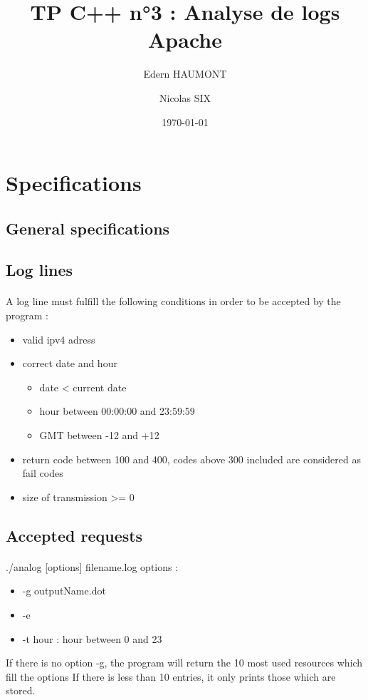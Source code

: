 \documentclass[a4paper, 12pts]{article}
\title{TP C++ n°3 : Analyse de logs Apache}
\author{Edern HAUMONT}
\author{Nicolas SIX}
\affil{B3111}
\date{\today}
\begin{document}

\maketitle



\section{Specifications}
\subsection{General specifications}
\paragraph{}


\subsection{Log lines}
\paragraph{}
 A log line must fulfill the following conditions in order to be accepted by the program :
 \begin{itemize}[label=$\square$]
 \item valid ipv4 adress
 \item correct date and hour
 \begin{itemize}
 \item date < current date
 \item hour between 00:00:00 and 23:59:59
 \item GMT between -12 and +12
 \end{itemize}
 \item return code between 100 and 400, codes above 300 included are considered as fail codes
 \item size of transmission >= 0
 \end{itemize}
 
\subsection{Accepted requests}
\paragraph{}
 ./analog [options] filename.log
 options :
 \begin{itemize}[label=$\square$]
 \item -g outputName.dot
 \item -e
 \item -t hour : hour between 0 and 23
 \end{itemize}
 If there is no option -g, the program will return the 10 most used resources which fill the options
 If there is less than 10 entries, it only prints those which are stored.
\end{document}
